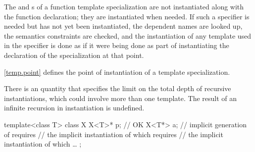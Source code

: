 \pnum
The  and s
of a function template specialization
are not instantiated along with the function declaration;
they are instantiated
when needed. If such a
specifier is needed but has not yet been
instantiated, the dependent names are looked up, the semantics constraints are
checked, and the instantiation of any template used in the
specifier is done as if it were being done as part
of instantiating the declaration of the specialization at that point.

\pnum
\begin{note}
\ref{temp.point} defines the point of instantiation of a template specialization.
\end{note}

\pnum
There is an  quantity
that specifies the limit on the total depth of recursive instantiations,
which could involve more than one template.
The result of an infinite recursion in instantiation is undefined.
\begin{example}
\begin{codeblock}
template<class T> class X {
  X<T>* p;          // OK
  X<T*> a;          // implicit generation of  requires
                    // the implicit instantiation of  which requires
                    // the implicit instantiation of  which \ldots
};
\end{codeblock}
\end{example}

